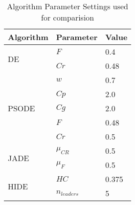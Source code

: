 

\begin{table}[]
\centering
\caption{Algorithm Parameter Settings used for comparision}
\label{}
\begin{tabular}{|l|l|l|}
\hline
Algorithm & Parameter & Value \\
\hline
\multirow{2}{*}{DE} & $F$ & 0.4 \\ \cline{2-3} 
                  & $Cr$ & 0.48 \\ \hline
\multirow{5}{*}{PSODE} & $w$ & 0.7 \\ \cline{2-3} 
                  & $Cp$ & 2.0 \\ \cline{2-3} 
                  & $Cg$ & 2.0 \\ \cline{2-3} 
                  & $F$ & 0.48 \\ \cline{2-3} 
                  & $Cr$ & 0.5 \\ \hline
\multirow{2}{*}{JADE} & $\mu_{CR}$ & 0.5 \\ \cline{2-3} 
                  & $\mu_{F}$ & 0.5 \\ \hline
\multirow{2}{*}{HIDE} & $HC$ & 0.375 \\ \cline{2-3} 
                  & $n_{leaders}$ & 5 \\ \hline
\end{tabular}
\end{table}